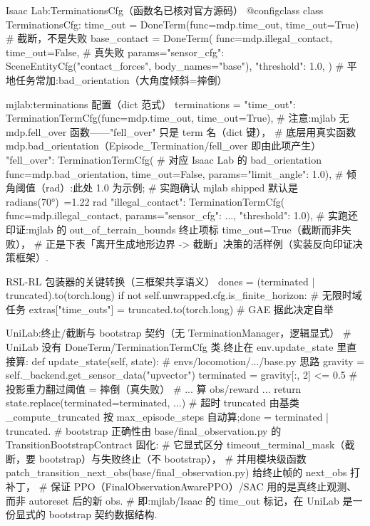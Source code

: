 \begin{codebox}[Python]{Isaac Lab:TerminationsCfg（函数名已核对官方源码）}
@configclass
class TerminationsCfg:
    time_out = DoneTerm(func=mdp.time_out, time_out=True)        # 截断，不是失败
    base_contact = DoneTerm(
        func=mdp.illegal_contact, time_out=False,                # 真失败
        params={"sensor_cfg": SceneEntityCfg("contact_forces",
                body_names="base"), "threshold": 1.0},
    )
    # 平地任务常加:bad_orientation（大角度倾斜=摔倒）
\end{codebox}

\begin{codebox}[Python]{mjlab:terminations 配置（dict 范式）}
terminations = {
    "time_out": TerminationTermCfg(func=mdp.time_out, time_out=True),
    # 注意:mjlab 无 mdp.fell_over 函数——"fell_over" 只是 term 名（dict 键），
    #   底层用真实函数 mdp.bad_orientation（Episode_Termination/fell_over 即由此项产生）
    "fell_over": TerminationTermCfg(            # 对应 Isaac Lab 的 bad_orientation
        func=mdp.bad_orientation, time_out=False,
        params={"limit_angle": 1.0}),           # 倾角阈值（rad）:此处 1.0 为示例;
                                                #   实跑确认 mjlab shipped 默认是 radians(70°)~=1.22 rad
    "illegal_contact": TerminationTermCfg(
        func=mdp.illegal_contact,
        params={"sensor_cfg": ..., "threshold": 1.0}),
    # 实跑还印证:mjlab 的 out_of_terrain_bounds 终止项标 time_out=True（截断而非失败），
    #   正是下表「离开生成地形边界 -> 截断」决策的活样例（实装反向印证决策框架）.
}
\end{codebox}

\begin{codebox}[Python]{RSL-RL 包装器的关键转换（三框架共享语义）}
dones = (terminated | truncated).to(torch.long)
if not self.unwrapped.cfg.is_finite_horizon:                    # 无限时域任务
    extras["time_outs"] = truncated.to(torch.long)             # GAE 据此决定自举
\end{codebox}

\begin{codebox}[Python]{UniLab:终止/截断与 bootstrap 契约（无 TerminationManager，逻辑显式）}
# UniLab 没有 DoneTerm/TerminationTermCfg 类.终止在 env.update_state 里直接算:
def update_state(self, state):                           # envs/locomotion/.../base.py 思路
    gravity = self._backend.get_sensor_data("upvector")
    terminated = gravity[:, 2] <= 0.5                    # 投影重力翻过阈值 = 摔倒（真失败）
    # ... 算 obs/reward ...
    return state.replace(terminated=terminated, ...)
# 超时 truncated 由基类 _compute_truncated 按 max_episode_steps 自动算;done = terminated | truncated.
# bootstrap 正确性由 base/final_observation.py 的 TransitionBootstrapContract 固化:
#   它显式区分 timeout_terminal_mask（截断，要 bootstrap）与失败终止（不 bootstrap），
#   并用模块级函数 patch_transition_next_obs(base/final_observation.py) 给终止帧的 next_obs 打补丁，
#   保证 PPO（FinalObservationAwarePPO）/SAC 用的是真终止观测、而非 autoreset 后的新 obs.
# 即:mjlab/Isaac 的 time_out 标记，在 UniLab 是一份显式的 bootstrap 契约数据结构.
\end{codebox}

